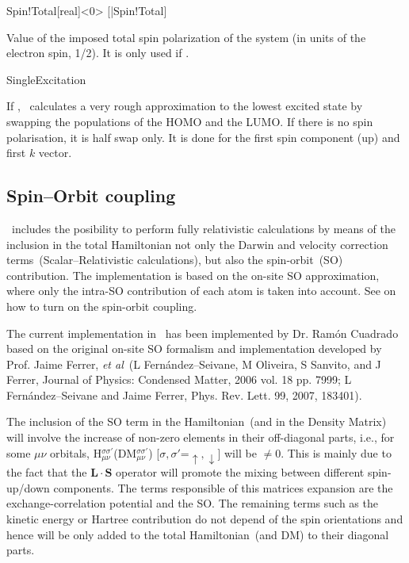 \begin{fdfentry}{Spin!Total}[real]<$0$>
  [|Spin!Total]
  
  Value of the imposed total spin polarization of the system (in units
  of the electron spin, 1/2). It is only used if  \fdftrue.
  
\end{fdfentry}

\begin{fdflogicalF}{SingleExcitation}

  If \fdftrue, \siesta\ calculates a very rough approximation to the
  lowest excited state by swapping the populations of the HOMO and the
  LUMO. If there is no spin polarisation, it is half swap only.  It is
  done for the first spin component (up) and first $k$ vector.
  
\end{fdflogicalF}


\subsection{Spin--Orbit coupling}
\label{sec:spin-orbit}

\siesta\ includes the posibility to perform fully relativistic
calculations by means of the inclusion in the total Hamiltonian not
only the Darwin and velocity correction terms~(Scalar--Relativistic
calculations), but also the spin-orbit~(SO) contribution. The
implementation is based on the on-site SO approximation, where only
the intra-SO contribution of each atom is taken into account. See
 on how to turn on the spin-orbit coupling.

The current implementation in \siesta\ has been implemented by
Dr. Ram\'on Cuadrado based on the original on-site SO formalism and
implementation developed by Prof. Jaime Ferrer, \textit{et al}~(L
Fern\'andez--Seivane, M Oliveira, S Sanvito, and J Ferrer, Journal of
Physics: Condensed Matter, 2006 vol. 18 pp. 7999; L
Fern\'andez--Seivane and Jaime Ferrer, Phys. Rev. Lett. 99, 2007,
183401).

The inclusion of the SO term in the Hamiltonian~(and in the Density
Matrix) will involve the increase of non-zero elements in their
off-diagonal parts, i.e., for some $\mu\nu$ orbitals,
H$^{\sigma\sigma'}_{\mu\nu}$(DM$^{\sigma\sigma'}_{\mu\nu}$)
[$\sigma,\sigma'$=$\uparrow,\downarrow$] will be $\neq$0. This is
mainly due to the fact that the $\mathbf L\cdot\mathbf S$ operator
will promote the mixing between different spin-up/down components. The
terms responsible of this matrices expansion are the
exchange-correlation potential and the SO. The remaining terms such as
the kinetic energy or Hartree contribution do not depend of the spin
orientations and hence will be only added to the total
Hamiltonian~(and DM) to their diagonal parts.

